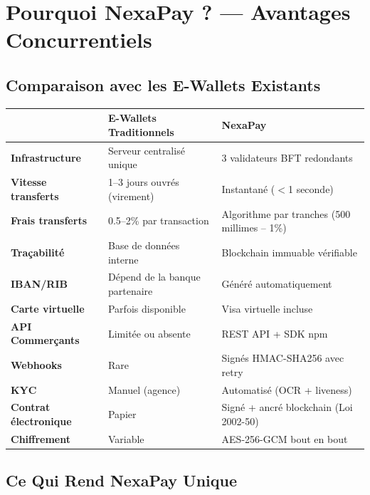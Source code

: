 \documentclass[11pt,a4paper]{article}
\begin{document}
\newpage

\section{Pourquoi NexaPay ? --- Avantages Concurrentiels}

\subsection{Comparaison avec les E-Wallets Existants}

\begin{center}
\begin{tabular}{|p{3.8cm}|p{4.2cm}|p{4.2cm}|}
\hline
\textbf{} & \textbf{E-Wallets Traditionnels} & \textbf{NexaPay} \\
\hline
\textbf{Infrastructure} & Serveur centralis\'e unique & 3 validateurs BFT redondants \\
\hline
\textbf{Vitesse transferts} & 1--3 jours ouvr\'es (virement) & Instantan\'e ($<$1 seconde) \\
\hline
\textbf{Frais transferts} & 0.5--2\% par transaction & Algorithme par tranches (500 millimes -- 1\%) \\
\hline
\textbf{Tra\c{c}abilit\'e} & Base de donn\'ees interne & Blockchain immuable v\'erifiable \\
\hline
\textbf{IBAN/RIB} & D\'epend de la banque partenaire & G\'en\'er\'e automatiquement \\
\hline
\textbf{Carte virtuelle} & Parfois disponible & Visa virtuelle incluse \\
\hline
\textbf{API Commer\c{c}ants} & Limit\'ee ou absente & REST API + SDK npm \\
\hline
\textbf{Webhooks} & Rare & Sign\'es HMAC-SHA256 avec retry \\
\hline
\textbf{KYC} & Manuel (agence) & Automatis\'e (OCR + liveness) \\
\hline
\textbf{Contrat \'electronique} & Papier & Sign\'e + ancr\'e blockchain (Loi 2002-50) \\
\hline
\textbf{Chiffrement} & Variable & AES-256-GCM bout en bout \\
\hline
\end{tabular}
\end{center}

\subsection{Ce Qui Rend NexaPay Unique}
\end{document}
